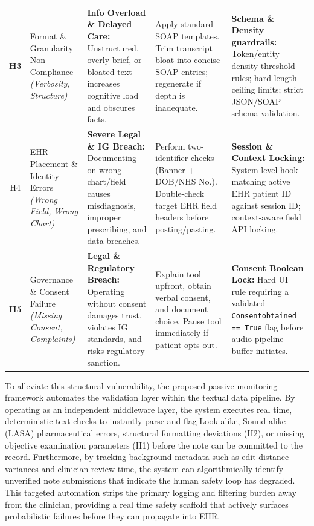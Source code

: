 \documentclass[11pt,a4paper]{article}
\begin{document}
\begin{xltabular}{\linewidth}{>{\bfseries}c >{\raggedright\arraybackslash}p{2.5cm} >{\raggedright\arraybackslash}X >{\raggedright\arraybackslash}X >{\raggedright\arraybackslash}X}
H3 & Format \& Granularity Non-Compliance \newline \textit{(Verbosity, Structure)} & \textbf{Info Overload \& Delayed Care:} Unstructured, overly brief, or bloated text increases cognitive load and obscures facts. & Apply standard SOAP templates. Trim transcript bloat into concise SOAP entries; regenerate if depth is inadequate. & \textbf{Schema \& Density guardrails:} Token/entity density threshold rules; hard length ceiling limits; strict JSON/SOAP schema validation. \\

H4& EHR Placement \& Identity Errors \newline \textit{(Wrong Field, Wrong Chart)} & \textbf{Severe Legal \& IG Breach:} Documenting on wrong chart/field causes misdiagnosis, improper prescribing, and data breaches. & Perform two-identifier checks (Banner + DOB/NHS No.). Double-check target EHR field headers before posting/pasting. & \textbf{Session \& Context Locking:} System-level hook matching active EHR patient ID against session ID; context-aware field API locking. \\

H5 & Governance \& Consent Failure \newline \textit{(Missing Consent, Complaints)} & \textbf{Legal \& Regulatory Breach:} Operating without consent damages trust, violates IG standards, and risks regulatory sanction. & Explain tool upfront, obtain verbal consent, and document choice. Pause tool immediately if patient opts out. & \textbf{Consent Boolean Lock:} Hard UI rule requiring a validated \texttt{Consentobtained == True} flag before audio pipeline buffer initiates. \\

\end{xltabular}





To alleviate this structural vulnerability, the proposed passive monitoring framework automates the validation layer within the textual data pipeline. By operating as an independent middleware layer, the system executes real time, deterministic text checks to instantly parse and flag Look alike, Sound alike (LASA) pharmaceutical errors, structural formatting deviations (H2), or missing objective examination parameters (H1) before the note can be committed to the record. Furthermore, by tracking background metadata such as edit distance variances and clinician review time, the system can algorithmically identify unverified note submissions that indicate the human safety loop has degraded. This targeted automation strips the primary logging and filtering burden away from the clinician, providing a real time safety scaffold that actively surfaces probabilistic failures before they can propagate into EHR.
\end{document}
